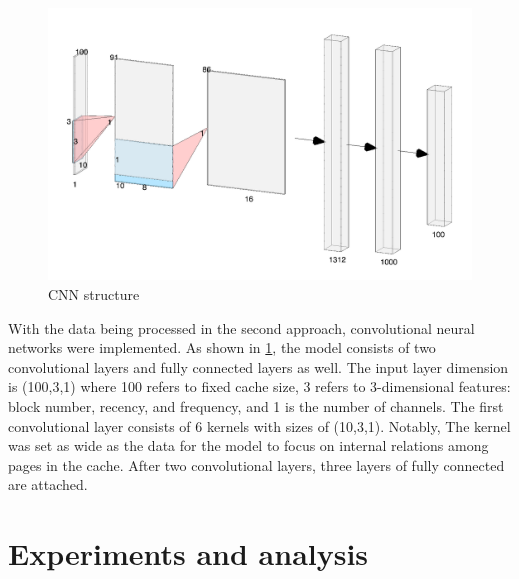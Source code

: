 \documentclass[letterpaper,twocolumn,10pt]{article}
\begin{document}
\begin{figure}[!ht]
	\centering 
	\includegraphics[width=0.38\textheight]{NN.png}
	\caption{CNN structure}
	\label{fig:nn_design}
\end{figure}


With the data being processed in the second approach, convolutional neural networks were implemented. As shown in \ref{fig:nn_design}, the model consists of two convolutional layers and fully connected layers as well. The input layer dimension is (100,3,1) where 100 refers to fixed cache size, 3 refers to 3-dimensional features: block number, recency, and frequency, and 1 is the number of channels. The first convolutional layer consists of 6 kernels with sizes of (10,3,1). Notably, The kernel was set as wide as the data for the model to focus on internal relations among pages in the cache. After two convolutional layers, three layers of fully connected are attached.

\section{Experiments and analysis}
\end{document}
